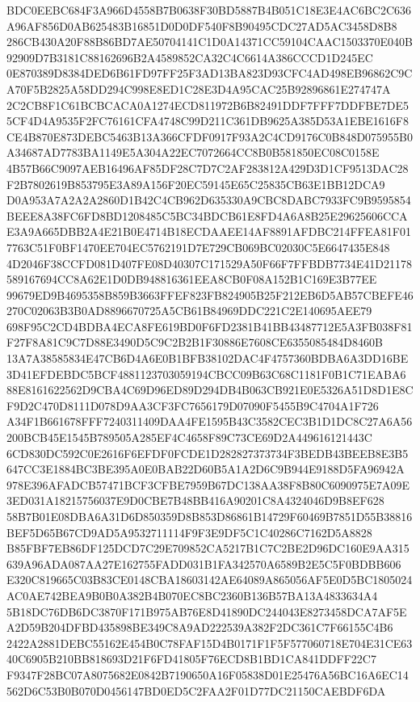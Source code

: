 \documentclass[UTF8,fontset=fandol,zihao=-4,a4paper]{ctexart}
\begin{document}
{{BDC0EEBC684F3A966D4558B7B0638F30BD5887B4B051C18E3E4AC6BC2C636A96AF856D0AB625483B16851D0D0DF540F8B90495CDC27AD5AC3458D8B8
286CB430A20F88B86BD7AE50704141C1D0A14371CC59104CAAC1503370E040B92909D7B3181C88162696B2A4589852CA32C4C6614A386CCCD1D245EC
0E870389D8384DED6B61FD97FF25F3AD13BA823D93CFC4AD498EB96862C9CA70F5B2825A58DD294C998E8ED1C28E3D4A95CAC25B92896861E274747A
2C2CB8F1C61BCBCACA0A1274ECD811972B6B82491DDF7FFF7DDFBE7DE55CF4D4A9535F2FC76161CFA4748C99D211C361DB9625A385D53A1EBE1616F8
CE4B870E873DEBC5463B13A366CFDF0917F93A2C4CD9176C0B848D075955B0A34687AD7783BA1149E5A304A22EC7072664CC8B0B581850EC08C0158E
4B57B66C9097AEB16496AF85DF28C7D7C2AF283812A429D3D1CF9513DAC28F2B7802619B853795E3A89A156F20EC59145E65C25835CB63E1BB12DCA9
D0A953A7A2A2A2860D1B42C4CB962D635330A9CBC8DABC7933FC9B9595854BEEE8A38FC6FD8BD1208485C5BC34BDCB61E8FD4A6A8B25E29625606CCA
E3A9A665DBB2A4E21B0E4714B18ECDAAEE14AF8891AFDBC214FFEA81F017763C51F0BF1470EE704EC5762191D7E729CB069BC02030C5E6647435E848
4D2046F38CCFD081D407FE08D40307C171529A50F66F7FFBDB7734E41D21178589167694CC8A62E1D0DB948816361EEA8CB0F08A152B1C169E3B77EE
99679ED9B4695358B859B3663FFEF823FB824905B25F212EB6D5AB57CBEFE46270C02063B3B0AD8896670725A5CB61B84969DDC221C2E140695AEE79
698F95C2CD4BDBA4ECA8FE619BD0F6FD2381B41BB43487712E5A3FB038F81F27F8A81C9C7D88E3490D5C9C2B2B1F30886E7608CE6355085484D8460B
13A7A38585834E47CB6D4A6E0B1BFB38102DAC4F4757360BDBA6A3DD16BE3D41EFDEBDC5BCF4881123703059194CBCC09B63C68C1181F0B1C71EABA6
88E8161622562D9CBA4C69D96ED89D294DB4B063CB921E0E5326A51D8D1E8CF9D2C470D8111D078D9AA3CF3FC7656179D07090F5455B9C4704A1F726
A34F1B661678FFF7240311409DAA4FE1595B43C3582CEC3B1D1DC8C27A6A56200BCB45E1545B789505A285EF4C4658F89C73CE69D2A449616121443C
6CD830DC592C0E2616F6EFDF0FCDE1D282827373734F3BEDB43BEEB8E3B5647CC3E1884BC3BE395A0E0BAB22D60B5A1A2D6C9B944E9188D5FA96942A
978E396AFADCB57471BCF3CFBE7959B67DC138AA38F8B80C6090975E7A09E3ED031A18215756037E9D0CBE7B48BB416A90201C8A4324046D9B8EF628
58B7B01E08DBA6A31D6D850359D8B853D86861B14729F60469B7851D55B38816BEF5D65B67CD9AD5A9532711114F9F3E9DF5C1C40286C7162D5A8828
B85FBF7EB86DF125DCD7C29E709852CA5217B1C7C2BE2D96DC160E9AA315639A96ADA087AA27E162755FADD031B1FA342570A6589B2E5C5F0BDBB606
E320C819665C03B83CE0148CBA18603142AE64089A865056AF5E0D5BC1805024AC0AE742BEA9B0B0A382B4B070EC8BC2360B136B57BA13A4833634A4
5B18DC76DB6DC3870F171B975AB76E8D41890DC244043E8273458DCA7AF5EA2D59B204DFBD435898BE349C8A9AD222539A382F2DC361C7F66155C4B6
2422A2881DEBC55162E454B0C78FAF15D4B0171F1F5F577060718E704E31CE6340C6905B210BB818693D21F6FD41805F76ECD8B1BD1CA841DDFF22C7
F9347F28BC07A8075682E0842B7190650A16F05838D01E25476A56BC16A6EC14562D6C53B0B070D0456147BD0ED5C2FAA2F01D77DC21150CAEBDF6DA
}}
\end{document}
